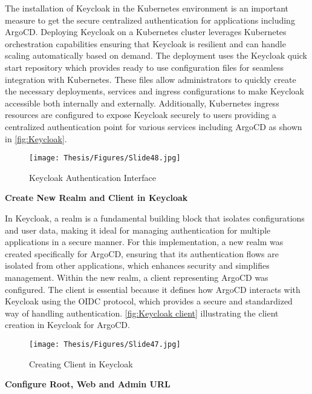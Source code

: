 The installation of Keycloak in the Kubernetes environment is an important measure to get the secure centralized authentication for applications including ArgoCD. Deploying Keycloak on a Kubernetes cluster leverages Kubernetes orchestration capabilities ensuring that Keycloak is resilient and can handle scaling automatically based on demand. The deployment uses the Keycloak quick start repository which provides ready to use configuration files for seamless integration with Kubernetes. These files allow administrators to quickly create the necessary deployments, services and ingress configurations to make Keycloak accessible both internally and externally. Additionally, Kubernetes ingress resources are configured to expose Keycloak securely to users providing a centralized authentication point for various services including ArgoCD as shown in \autoref{fig:Keycloak}. \cite{keycloak_quickstarts}

\clearpage

\begin{figure}[h]
\centering
\texttt{[image: Thesis/Figures/Slide48.jpg]}
\caption{\label{fig:Keycloak}Keycloak Authentication Interface}
\end{figure}



\textbf{Create New Realm and Client in Keycloak}

In Keycloak, a realm is a fundamental building block that isolates configurations and user data, making it ideal for managing authentication for multiple applications in a secure manner. For this implementation, a new realm was created specifically for ArgoCD, ensuring that its authentication flows are isolated from other applications, which enhances security and simplifies management. Within the new realm, a client representing ArgoCD was configured. The client is essential because it defines how ArgoCD interacts with Keycloak using the OIDC protocol, which provides a secure and standardized way of handling authentication. \autoref{fig:Keycloak client} illustrating the client creation in Keycloak for ArgoCD. \cite{openid-connect-core-1_0, keycloak_doc}


\begin{figure}[h]
\centering
\texttt{[image: Thesis/Figures/Slide47.jpg]}
\caption{\label{fig:Keycloak client}Creating Client in Keycloak}
\end{figure}

\clearpage

\textbf{Configure Root, Web and Admin URL}

